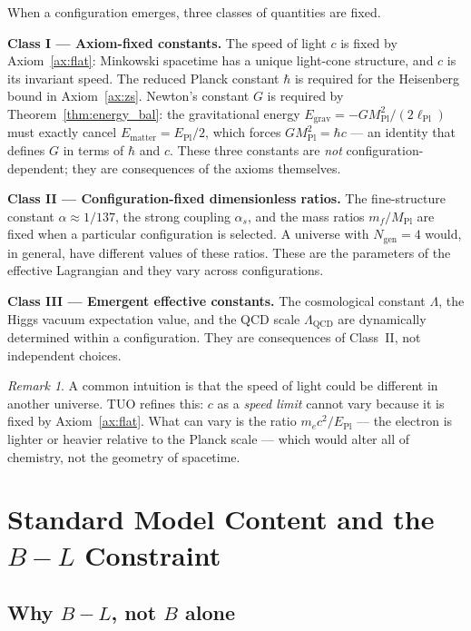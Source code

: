 \documentclass[12pt,a4paper]{article}
\theoremstyle{definition}
\theoremstyle{remark}
\newtheorem{remark}[theorem]{Remark}
\newcommand{\EPl}{E_{\mathrm{Pl}}}
\newcommand{\lPl}{\ell_{\mathrm{Pl}}}
\newcommand{\MPl}{M_{\mathrm{Pl}}}
\begin{document}
When a configuration emerges, three classes of quantities are fixed.

\textbf{Class I --- Axiom-fixed constants.}
The speed of light $c$ is fixed by Axiom~\ref{ax:flat}: Minkowski spacetime
has a unique light-cone structure, and $c$ is its invariant speed.
The reduced Planck constant $\hbar$ is required for the Heisenberg bound
in Axiom~\ref{ax:zs}. Newton's constant $G$ is required by
Theorem~\ref{thm:energy_bal}: the gravitational energy $E_\mathrm{grav} = -G\MPl^2/(2\lPl)$
must exactly cancel $E_\mathrm{matter} = \EPl/2$, which forces
$G\MPl^2 = \hbar c$ --- an identity that defines $G$ in terms of
$\hbar$ and $c$. These three constants are \emph{not} configuration-dependent;
they are consequences of the axioms themselves.

\textbf{Class II --- Configuration-fixed dimensionless ratios.}
The fine-structure constant $\alpha \approx 1/137$, the strong coupling
$\alpha_s$, and the mass ratios $m_f/\MPl$ are fixed when a particular
configuration is selected. A universe with $N_\mathrm{gen} = 4$ would,
in general, have different values of these ratios. These are the parameters
of the effective Lagrangian and they vary across configurations.

\textbf{Class III --- Emergent effective constants.}
The cosmological constant $\Lambda$, the Higgs vacuum expectation value,
and the QCD scale $\Lambda_\mathrm{QCD}$ are dynamically determined within
a configuration. They are consequences of Class~II, not independent choices.

\begin{remark}
A common intuition is that the speed of light could be different in another
universe. TUO refines this: $c$ as a \emph{speed limit} cannot vary because
it is fixed by Axiom~\ref{ax:flat}. What can vary is the ratio $m_e c^2 / \EPl$
--- the electron is lighter or heavier relative to the Planck scale ---
which would alter all of chemistry, not the geometry of spacetime.
\end{remark}

\section{Standard Model Content and the $B-L$ Constraint}
\label{sec:sm}

\subsection{Why $B - L$, not $B$ alone}
\end{document}
